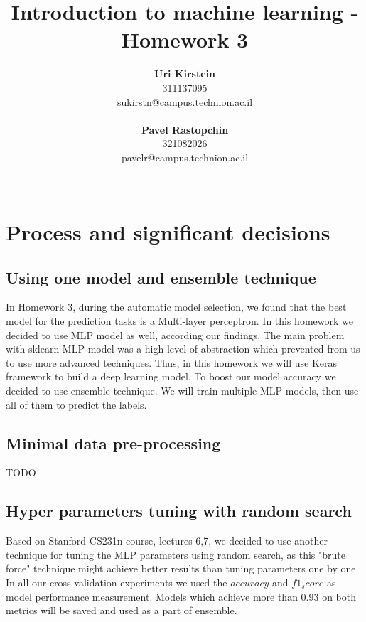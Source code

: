 \documentclass[12pt]{article}
\begin{document}
\title{\Huge Introduction to machine learning - Homework 3}

\author{
  \textbf{Uri Kirstein}\\
  311137095 \\ sukirstn@campus.technion.ac.il
  \\ \\
  \textbf{Pavel Rastopchin}\\
  321082026 \\ pavelr@campus.technion.ac.il
  \\ \\ 
}

\maketitle


\section{Process and significant decisions}
\subsection{Using one model and ensemble technique}
In Homework 3, during the automatic model selection, we found that the best model for the prediction tasks is a Multi-layer perceptron. In this homework we decided to use MLP model as well, according our findings. The main problem with sklearn MLP model was a high level of abstraction which prevented from us to use more advanced techniques. Thus, in this homework we will use Keras framework to build a deep learning model. To boost our model accuracy we decided to use ensemble technique. We will train multiple MLP models, then use all of them to predict the labels. 

\subsection{Minimal data pre-processing}
TODO

\subsection{Hyper parameters tuning with random search}
Based on Stanford CS231n course, lectures 6,7, we decided to use another technique for tuning the MLP parameters using random search, as this "brute force" technique might achieve better results than tuning parameters one by one. In all our cross-validation experiments we used the $accuracy$ and $f1_score$ as model performance measurement. Models which achieve more than 0.93 on both metrics will be saved and used as a part of ensemble.
\end{document}
